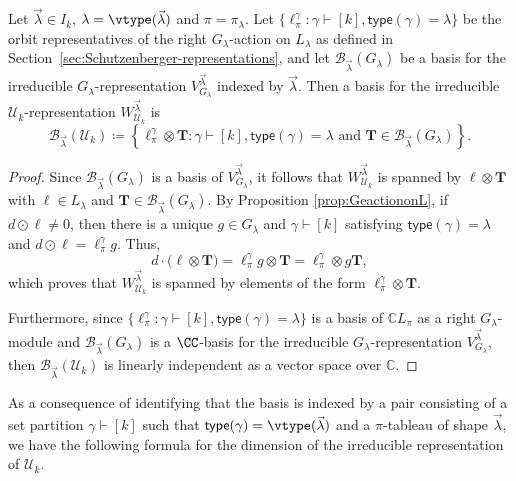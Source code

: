\begin{prop} \label{prop:irrepbasis}
Let $\vec{\lambda} \in I_k$, $\lambda = \vtype(\vec{\lambda})$ and $\pi = \pi_\lambda$.
Let
$\{\ell_\pi^\gamma : \gamma \vdash [k], \mathsf{type}(\gamma) = \lambda\}$
be the orbit representatives of the right $G_\lambda$-action on $L_\lambda$ as defined in
Section~\ref{sec:Schutzenberger-representations},
and let $\mathcal{B}_{\vec{\lambda}}(G_\lambda)$ be a basis for the irreducible
$G_\lambda$-representation $V_{G_\lambda}^{\vec{\lambda}}$ indexed by $\vec{\lambda}$.
Then a basis for the irreducible $\mathcal{U}_k$-representation $W_{\mathcal{U}_k}^{\vec{\lambda}}$ is
\[
    \mathcal{B}_{\vec{\lambda}}(\mathcal{U}_k) \coloneqq \left\{ \ell_\pi^\gamma \otimes \mathbf{T} : \gamma \vdash [k], \mathsf{type}(\gamma) = \lambda \text{ and }
    \mathbf{T} \in \mathcal{B}_{\vec{\lambda}}(G_\lambda) \right\}.
\]
\end{prop}

\begin{proof}
    Since $\mathcal{B}_{\vec{\lambda}}(G_\lambda)$ is a basis of $V_{G_\lambda}^{\vec{\lambda}}$,
    it follows that $W_{\mathcal{U}_k}^{\vec{\lambda}}$ is spanned by $\ell \otimes \mathbf{T}$
    with $\ell \in L_\lambda$ and $\mathbf{T} \in \mathcal{B}_{\vec{\lambda}}(G_{\lambda})$.
    By Proposition \ref{prop:GeactiononL}, if $d\odot \ell\neq 0$, then there is a
    unique $g \in G_{\lambda}$ and $\gamma \vdash [k]$ satisfying $\mathsf{type}(\gamma) = \lambda$ and
    $d\odot \ell = \ell_\pi^\gamma g$. Thus,
    \begin{equation*}
        d \cdot \big(\ell \otimes \mathbf{T}\big)
        = \ell_\pi^{\gamma} g \otimes \mathbf{T}
        = \ell_\pi^{\gamma} \otimes g \mathbf{T},
    \end{equation*}
    which proves that $W_{\mathcal{U}_k}^{\vec{\lambda}}$ is spanned by elements of the form $\ell_\pi^\gamma \otimes \mathbf{T}$.

Furthermore, since $\{\ell_\pi^\gamma : \gamma \vdash [k], \mathsf{type}(\gamma) = \lambda\}$
is a basis of $\mathbb{C}L_\pi$ as a right $G_\lambda$-module
and $\mathcal{B}_{\vec{\lambda}}(G_\lambda)$ is a $\CC$-basis
for the irreducible $G_\lambda$-representation $V^{\vec{\lambda}}_{G_\lambda}$, then
$\mathcal{B}_{\vec{\lambda}}(\mathcal{U}_k)$ is linearly independent
as a vector space over $\mathbb{C}$.
\end{proof}

As a consequence of identifying that the basis is indexed by a pair
consisting of a set partition $\gamma \vdash [k]$ such that
$\mathsf{type}(\gamma) = \vtype(\vec{\lambda})$ and a $\pi$-tableau of
shape $\vec{\lambda}$, we have the following formula for the dimension of
the irreducible representation of $\mathcal{U}_k$.

